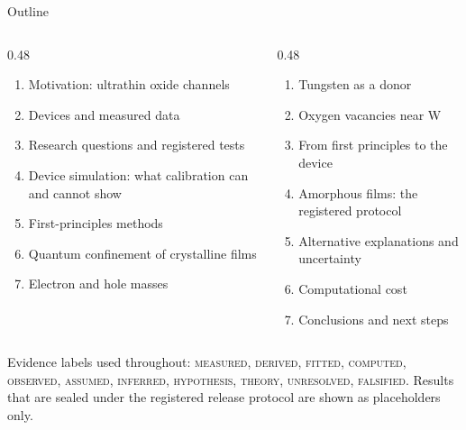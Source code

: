 \begin{frame}{Outline}
  \begin{columns}[T]
    \begin{column}{0.48\linewidth}
      \begin{enumerate}\small
        \item Motivation: ultrathin oxide channels
        \item Devices and measured data
        \item Research questions and registered tests
        \item Device simulation: what calibration can and cannot show
        \item First-principles methods
        \item Quantum confinement of crystalline \InO{} films
        \item Electron and hole masses
      \end{enumerate}
    \end{column}
    \begin{column}{0.48\linewidth}
      \begin{enumerate}\small\setcounter{enumi}{7}
        \item Tungsten as a donor
        \item Oxygen vacancies near W
        \item From first principles to the device
        \item Amorphous films: the registered protocol
        \item Alternative explanations and uncertainty
        \item Computational cost
        \item Conclusions and next steps
      \end{enumerate}
    \end{column}
  \end{columns}
  \vfill
  {\scriptsize\color{inkgrey} Evidence labels used throughout: \textsc{measured}, \textsc{derived}, \textsc{fitted},
  \textsc{computed}, \textsc{observed}, \textsc{assumed}, \textsc{inferred}, \textsc{hypothesis}, \textsc{theory},
  \textsc{unresolved}, \textsc{falsified}. Results that are sealed under the
  registered release protocol are shown as placeholders only.\par}
\end{frame}
